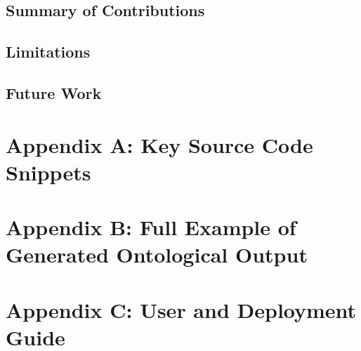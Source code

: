 \documentclass[12pt, a4paper]{article}
\begin{document}
    \subsection{Summary of Contributions}
    \subsection{Limitations}
    \subsection{Future Work}

\newpage

\newpage
\appendix
\section{Appendix A: Key Source Code Snippets}

\section{Appendix B: Full Example of Generated Ontological Output}

\section{Appendix C: User and Deployment Guide}
\end{document}
